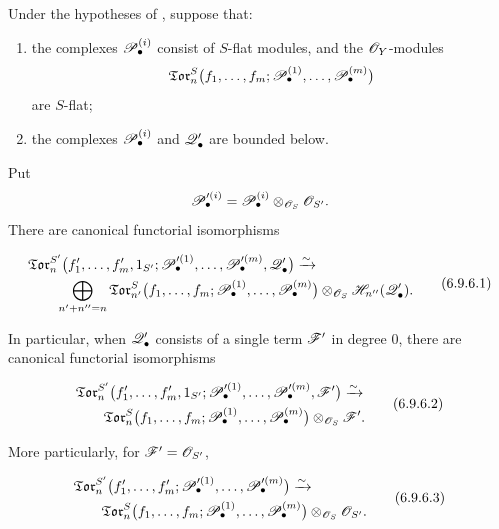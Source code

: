 \begin{corollary}[6.9.6]
\label{III.6.9.6}
Under the hypotheses of , suppose that:
\begin{enumerate}
  \item[$1^\circ$] the complexes $\mathscr{P}_\bullet^{(i)}$ consist of
  $S$-flat modules, and the $\mathscr{O}_Y$-modules
  \[
    \mathfrak{Tor}_n^S
    \bigl(
      f_1,\ldots,f_m;
      \mathscr{P}_\bullet^{(1)},\ldots,\mathscr{P}_\bullet^{(m)}
    \bigr)
  \]
  are $S$-flat;
  \item[$2^\circ$] the complexes $\mathscr{P}_\bullet^{(i)}$ and
  $\mathscr{Q}_\bullet'$ are bounded below.
\end{enumerate}


Put
\[
  \mathscr{P}_\bullet^{\prime(i)}
  =
  \mathscr{P}_\bullet^{(i)}
  \otimes_{\mathscr{O}_S}\mathscr{O}_{S'}.
\]
There are canonical functorial isomorphisms
\begin{env}[6.9.6.1]
\label{III.6.9.6.1}
\[
\begin{split}
  &
  \mathfrak{Tor}_n^{S'}
  \bigl(
    f_1',\ldots,f_m',1_{S'};
    \mathscr{P}_\bullet^{\prime(1)},\ldots,
    \mathscr{P}_\bullet^{\prime(m)},\mathscr{Q}_\bullet'
  \bigr)
  \xrightarrow{\sim}
  \\
  &\qquad
  \bigoplus_{n'+n''=n}
  \mathfrak{Tor}_{n'}^S
  \bigl(
    f_1,\ldots,f_m;
    \mathscr{P}_\bullet^{(1)},\ldots,\mathscr{P}_\bullet^{(m)}
  \bigr)
  \otimes_{\mathscr{O}_S}
  \mathscr{H}_{n''}(\mathscr{Q}_\bullet').
\end{split}
  \tag{6.9.6.1}\label{III.6.9.6.1.eq}
\]
\end{env}

In particular, when $\mathscr{Q}_\bullet'$ consists of a single term
$\mathscr{F}'$ in degree $0$, there are canonical functorial
isomorphisms
\begin{env}[6.9.6.2]
\label{III.6.9.6.2}
\[
\begin{split}
  &
  \mathfrak{Tor}_n^{S'}
  \bigl(
    f_1',\ldots,f_m',1_{S'};
    \mathscr{P}_\bullet^{\prime(1)},\ldots,
    \mathscr{P}_\bullet^{\prime(m)},\mathscr{F}'
  \bigr)
  \xrightarrow{\sim}
  \\
  &\qquad
  \mathfrak{Tor}_n^S
  \bigl(
    f_1,\ldots,f_m;
    \mathscr{P}_\bullet^{(1)},\ldots,\mathscr{P}_\bullet^{(m)}
  \bigr)
  \otimes_{\mathscr{O}_S}\mathscr{F}'.
\end{split}
  \tag{6.9.6.2}\label{III.6.9.6.2.eq}
\]
\end{env}
More particularly, for $\mathscr{F}'=\mathscr{O}_{S'}$,
\begin{env}[6.9.6.3]
\label{III.6.9.6.3}
\[
\begin{split}
  &
  \mathfrak{Tor}_n^{S'}
  \bigl(
    f_1',\ldots,f_m';
    \mathscr{P}_\bullet^{\prime(1)},\ldots,
    \mathscr{P}_\bullet^{\prime(m)}
  \bigr)
  \xrightarrow{\sim}
  \\
  &\qquad
  \mathfrak{Tor}_n^S
  \bigl(
    f_1,\ldots,f_m;
    \mathscr{P}_\bullet^{(1)},\ldots,\mathscr{P}_\bullet^{(m)}
  \bigr)
  \otimes_{\mathscr{O}_S}\mathscr{O}_{S'}.
\end{split}
  \tag{6.9.6.3}\label{III.6.9.6.3.eq}
\]
\end{env}
\end{corollary}

